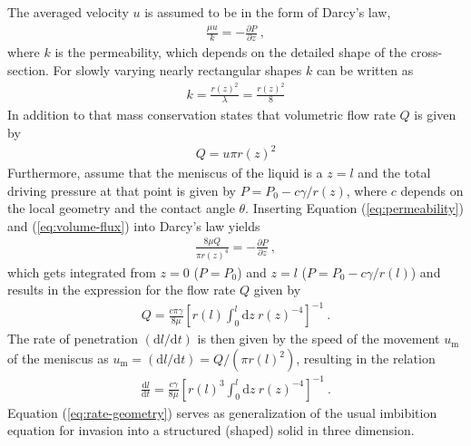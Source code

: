 \documentclass[aip, amsmath, amssymb, reprint, twocolumn, floatfix]{revtex4-1}
\newcommand{\dldt}{\frac{\mathrm{d}l}{\mathrm{d}t}}
\newcommand{\Pt}{P}
\newcommand{\dz}{\mathrm{d}z}
\begin{document}
The averaged velocity $u$ is assumed to be in the form of Darcy's law,
\begin{gather}
	\frac{\mu u}{k} = -\frac{\partial \Pt}{\partial z}~,
	\label{eq:darcy-law}
\end{gather}
where $k$ is the permeability, which depends on the detailed shape of the cross-section. For slowly varying nearly rectangular shapes $k$ can be written as
\begin{gather}
	k = \frac{r(z)^2}{\lambda} = \frac{r(z)^2}{8}
	\label{eq:permeability}
\end{gather}
In addition to that mass conservation states that volumetric flow rate $Q$ is given by
\begin{gather}
	Q = u \pi r(z)^2  
	\label{eq:volume-flux}
\end{gather}
Furthermore, assume that the meniscus of the liquid is a $z = l$ and the total driving pressure at that point is given by $\Pt = P_0 - c \gamma/r(z)$, where $c$ depends on the local geometry and the contact angle $\theta$. Inserting Equation (\ref{eq:permeability}) and (\ref{eq:volume-flux}) into Darcy's law yields
\begin{gather}
	\frac{8 \mu Q}{\pi r(z)^4} = -\frac{\partial \Pt}{\partial z}~,
	\label{eq:darcy-law-flux}
\end{gather}
which gets integrated from $z=0$ ($\Pt = P_0$) and $z = l$ ($\Pt = P_0  - c \gamma/r(l)$) and results in the expression for the flow rate $Q$ given by
\begin{gather}
	Q = \frac{c \pi \gamma}{8\mu} \left[ r(l) \int_0^{l}\!\!\!\dz~r(z)^{-4} \right]^{-1}~.
	\label{eq:volume-flux-integral}
\end{gather}
The rate of penetration $\left(\mathrm{d}l/\mathrm{d}t\right)$ is then given by the speed of the movement $u_\mathrm{m}$ of the meniscus as $u_\mathrm{m} = \left(\mathrm{d}l/\mathrm{d}t\right) = Q / (\pi r(l)^2)$, resulting in the relation
\begin{gather}
	\boxed{\dldt = \frac{c \gamma}{8\mu} \left[ r(l)^3 \int_0^{l}\!\!\!\dz~r(z)^{-4} \right]^{-1}}~.
	\label{eq:rate-geometry}
\end{gather}
Equation (\ref{eq:rate-geometry}) serves as generalization of the usual imbibition equation for invasion into a structured (shaped) solid in three dimension.
\bigskip
\end{document}
